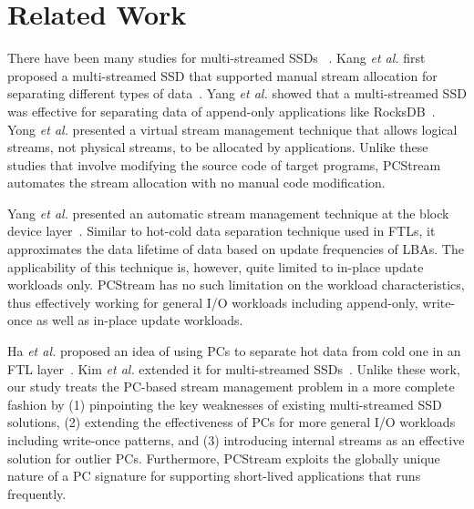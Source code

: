 \vspace{-10pt}
\section{Related Work}
\vspace{-5pt}

There have been many studies for multi-streamed SSDs ~\cite{MultiStream, Level,
vStream, FStream, AutoStream, PCStream}.  Kang {\it et al.} first proposed a
multi-streamed SSD that supported manual stream allocation for separating
different types of data~\cite{MultiStream}.  Yang {\it et al.} showed that a
multi-streamed SSD was effective for separating data of append-only
applications like RocksDB~\cite{Level}.  Yong {\it et al.} presented a virtual
stream management technique that allows logical streams, not physical streams,
to be allocated by applications.  Unlike these studies that involve modifying
the source code of target programs, \textsf{\small PCStream} automates the
stream allocation with no manual code modification.

\begin{comment}
Rho {\it et al.} proposed a stream management technique, called FStream, at the
file system layer~\cite{FStream}. In FStream, metadata, journal
data, and user data that may have different lifetime characteristics were
allocated to separate streams.  Since FStream was implemented as a part of a file
system, it was not able to directly detect application's I/O behaviors.
Also, it may be hard to be deployed in practice due to 
a strong dependence on file system-specific implementation details.
\textsf{\small PCStream}, on the other hand, efficiently exploits
programs' I/O behaviors using PCs with no file system-specific modifications.
\end{comment}

Yang {\it et al.} presented an automatic stream management technique at the
block device layer~\cite{AutoStream}. Similar to hot-cold data separation
technique used in FTLs, it approximates the data lifetime of data based on
update frequencies of LBAs.  The applicability of this technique is, however,
quite limited to in-place update workloads only.  \textsf{\small PCStream} has
no such limitation on the workload characteristics, thus effectively working
for general I/O workloads including append-only, write-once 
as well as in-place update workloads.

Ha {\it et al.} proposed an idea of using PCs to separate hot data from cold
one in an FTL layer~\cite{PCHa}.  Kim {\it et al.} extended it for
multi-streamed SSDs~\cite{PCStream}.  Unlike these work, our study treats the
PC-based stream management problem in a more complete fashion by (1)
pinpointing the key weaknesses of existing multi-streamed SSD solutions, (2)
extending the effectiveness of PCs for more general I/O workloads including
write-once patterns, and (3) introducing internal streams as an effective
solution for outlier PCs.  Furthermore, \textsf{\small PCStream} exploits the
globally unique nature of a PC signature for supporting short-lived
applications that runs frequently.

